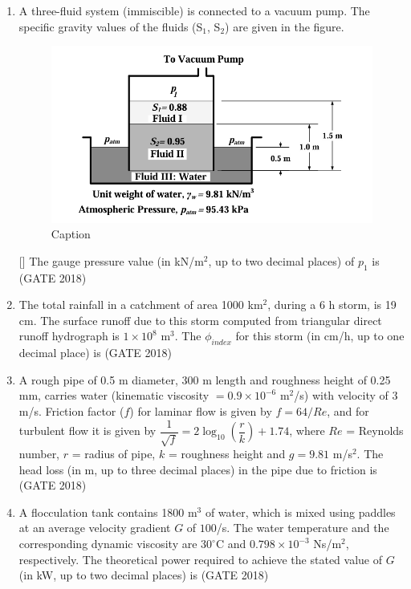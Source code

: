 \documentclass[journal,12pt,onecolumn]{IEEEtran}
\theoremstyle{remark}
\begin{document}
\begin{enumerate}
\item A three-fluid system (immiscible) is connected to a vacuum pump. The specific gravity values of the fluids (S$_1$, S$_2$) are given in the figure.
\begin{figure}[h]
    \centering
    \includegraphics[width=0.5\linewidth]{GATE-CE-2018/46-2.png}
    \caption{Caption}
    \label{46-2}
\end{figure}[]
The gauge pressure value (in kN/m$^2$, up to two decimal places) of $p_1$ is \underline{\hspace{3cm}}
\hfill{(GATE 2018)}
\vspace{1cm}

\item The total rainfall in a catchment of area 1000 km$^2$, during a 6 h storm, is 19 cm. The surface runoff due to this storm computed from triangular direct runoff hydrograph is $1\times 10^8$ m$^3$. The $\phi_{index}$ for this storm (in cm/h, up to one decimal place) is \underline{\hspace{3cm}}
\hfill{(GATE 2018)}
\vspace{1cm}

\item A rough pipe of 0.5 m diameter, 300 m length and roughness height of 0.25 mm, carries water (kinematic viscosity $=0.9\times 10^{-6}$ m$^2$/s) with velocity of 3 m/s. Friction factor ($f$) for laminar flow is given by $f=64/Re$, and for turbulent flow it is given by $\dfrac{1}{\sqrt{f}}=2\log_{10}\left(\dfrac{r}{k}\right)+1.74$, where $Re$ = Reynolds number, $r$ = radius of pipe, $k$ = roughness height and $g=9.81$ m/s$^2$. The head loss (in m, up to three decimal places) in the pipe due to friction is \underline{\hspace{3cm}}
\hfill{(GATE 2018)}
\vspace{1cm}

\item A flocculation tank contains 1800 m$^3$ of water, which is mixed using paddles at an average velocity gradient $G$ of $100$/s. The water temperature and the corresponding dynamic viscosity are $30^\circ$C and $0.798\times 10^{-3}$ Ns/m$^2$, respectively. The theoretical power required to achieve the stated value of $G$ (in kW, up to two decimal places) is \underline{\hspace{3cm}}
\hfill{(GATE 2018)}
\vspace{1cm}


\end{enumerate}
\end{document}
